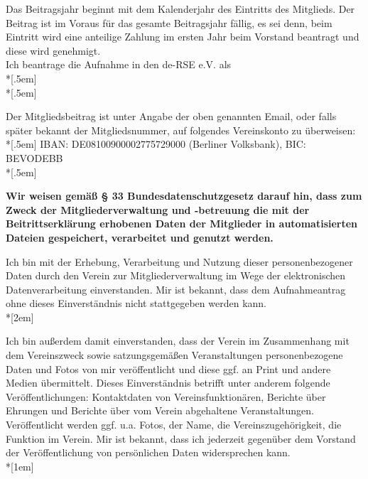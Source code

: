 \documentclass[../Vorlagen/de-RSE_Kopf,a4paper]{scrlttr2}
\begin{document}
\begin{letter}{}
Das Beitragsjahr beginnt mit dem Kalenderjahr des Eintritts des Mitglieds. Der Beitrag ist im Voraus für das gesamte Beitragsjahr fällig, es sei denn, beim Eintritt wird eine anteilige Zahlung im ersten Jahr beim Vorstand beantragt und diese wird genehmigt.\\

%
Ich beantrage die Aufnahme in den de-RSE e.V. als\\*[.5em]
\hspace{3cm}
\\*[.5em]

Der Mitgliedsbeitrag ist unter Angabe der oben genannten Email, oder falls später bekannt der Mitgliedsnummer, auf folgendes Vereinskonto zu überweisen:\\*[.5em]
IBAN: DE08100900002775729000 (Berliner Volksbank), BIC: BEVODEBB\\*[.5em]

\clearpage

\begin{spacing}{0.5}
\textbf{
Wir weisen gemäß § 33 Bundesdatenschutzgesetz darauf hin, dass zum Zweck der Mitgliederverwaltung und -betreuung die mit der Beitrittserklärung erhobenen Daten der Mitglieder in automatisierten Dateien gespeichert, verarbeitet und genutzt werden.}

Ich bin mit der Erhebung, Verarbeitung und Nutzung dieser personenbezogener Daten durch den Verein zur Mitgliederverwaltung im Wege der elektronischen Datenverarbeitung einverstanden.
Mir ist bekannt, dass dem Aufnahmeantrag ohne dieses Einverständnis nicht stattgegeben werden kann.\\*[2em]
\end{spacing}

Ich bin außerdem damit einverstanden, dass der Verein im Zusammenhang mit dem Vereinszweck sowie satzungsgemäßen Veranstaltungen personenbezogene Daten und Fotos von mir veröffentlicht und diese ggf. an Print und andere Medien übermittelt.
Dieses Einverständnis betrifft unter anderem folgende Veröffentlichungen: Kontaktdaten von Vereinsfunktionären, Berichte über Ehrungen und Berichte über vom Verein abgehaltene Veranstaltungen.
Veröffentlicht werden ggf. u.a. Fotos, der Name, die Vereinszugehörigkeit, die Funktion im Verein.
Mir ist bekannt, dass ich jederzeit gegenüber dem Vorstand der Veröffentlichung von persönlichen Daten widersprechen kann.\\*[1em]


\end{letter}
\end{document}
